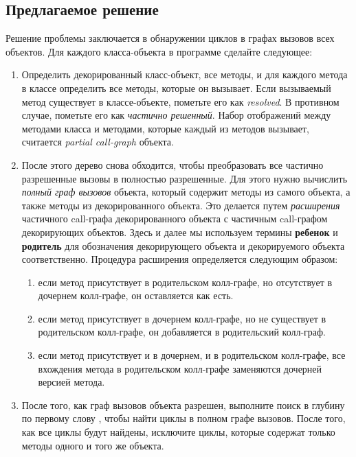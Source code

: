 \subsection{Предлагаемое решение}
\label{impl:mutualrec_algo}
Решение проблемы заключается в обнаружении циклов в графах вызовов всех объектов. Для каждого класса-объекта в программе сделайте следующее:
\begin{enumerate}
    \item Определить декорированный класс-объект, все методы, и для каждого метода в классе определить все методы, которые он вызывает. Если вызываемый метод существует в классе-объекте, пометьте его как \textit{resolved}. В противном случае, пометьте его как \textit{частично решенный}. Набор отображений между методами класса и методами, которые каждый из методов вызывает, считается \textit{partial call-graph} объекта.
    \item После этого дерево снова обходится, чтобы преобразовать все частично разрешенные вызовы в полностью разрешенные. Для этого нужно вычислить \textit{полный граф вызовов} объекта, который содержит методы из самого объекта, а также методы из декорированного объекта. Это делается путем \textit{расширения} частичного call-графа декорированного объекта с частичным call-графом декорирующих объектов. Здесь и далее мы используем термины \textbf{ребенок} и \textbf{родитель} для обозначения декорирующего объекта и декорируемого объекта соответственно. Процедура расширения определяется следующим образом:
          \begin{enumerate}
              \item если метод присутствует в родительском колл-графе, но отсутствует в дочернем колл-графе, он оставляется как есть.
              \item если метод присутствует в дочернем колл-графе, но не существует в родительском колл-графе, он добавляется в родительский колл-граф.
              \item если метод присутствует и в дочернем, и в родительском колл-графе, все вхождения метода в родительском колл-графе заменяются дочерней версией метода.
          \end{enumerate}
    \item После того, как граф вызовов объекта разрешен, выполните поиск в глубину по первому слову \cite{dfs}, чтобы найти циклы в полном графе вызовов. После того, как все циклы будут найдены, исключите циклы, которые содержат только методы одного и того же объекта.
\end{enumerate}

